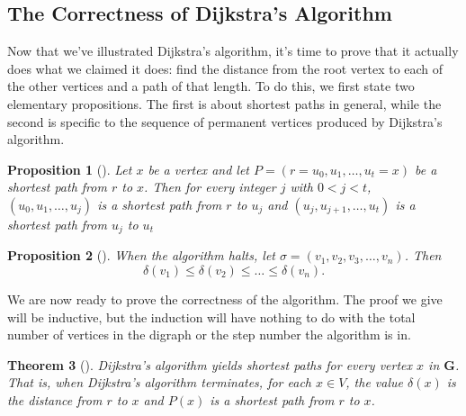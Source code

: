 \documentclass[10pt,]{book}
\theoremstyle{plain}
\newtheorem{theorem}{Theorem}[section]
\newtheorem{proposition}[theorem]{Proposition}
\theoremstyle{definition}
\theoremstyle{definition}
\theoremstyle{definition}
\theoremstyle{definition}
\numberwithin{equation}{section}
\newcommand{\bfG}{\mathbf{G}}
\newcommand{\lt}{<}
\begin{document}
\subsection[{The Correctness of Dijkstra's Algorithm}]{The Correctness of Dijkstra's Algorithm}\label{subsection-25}
\hypertarget{p-214}{}%
Now that we've illustrated Dijkstra's algorithm, it's time to prove that it actually does what we claimed it does: find the distance from the root vertex to each of the other vertices and a path of that length. To do this, we first state two elementary propositions. The first is about shortest paths in general, while the second is specific to the sequence of permanent vertices produced by Dijkstra's algorithm.%
\begin{proposition}[{}]\label{proposition-3}
\hypertarget{p-215}{}%
Let \(x\) be a vertex and let \(P=(r=u_0,u_1,\dots,u_t=x)\) be a shortest path from \(r\) to \(x\). Then for every integer \(j\) with \(0\lt j\lt t\), \((u_0,u_1,\dots,u_j)\) is a shortest path from \(r\) to \(u_j\) and \((u_j,u_{j+1},\dots,u_t)\) is a shortest path from \(u_j\) to \(u_t\)%
\end{proposition}
\begin{proposition}[{}]\label{proposition-4}
\hypertarget{p-216}{}%
When the algorithm halts, let \(\sigma=(v_1,v_2,v_3,\dots,v_n)\).  Then%
\begin{equation*}
\delta(v_1)\le \delta(v_2)\le\dots \le \delta(v_n).
\end{equation*}
%
\end{proposition}
\hypertarget{p-217}{}%
We are now ready to prove the correctness of the algorithm. The proof we give will be inductive, but the induction will have nothing to do with the total number of vertices in the digraph or the step number the algorithm is in.%
\begin{theorem}[{}]\label{theorem-4}
\hypertarget{p-218}{}%
Dijkstra's algorithm yields shortest paths for every vertex \(x\) in \(\bfG\). That is, when Dijkstra's algorithm terminates, for each \(x\in V\), the value \(\delta(x)\) is the distance from \(r\) to \(x\) and \(P(x)\) is a shortest path from \(r\) to \(x\).%
\end{theorem}
\end{document}
